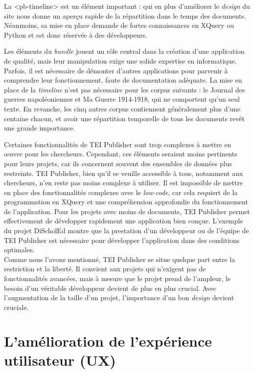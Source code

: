 La <pb-timeline> est un élément important : qui en plus d'améliorer le \textit{design} du site nous donne un aperçu rapide de la répartition dans le temps des documents. Néanmoins, sa mise en place demande de fortes connaissances en XQuery ou Python et est donc réservée à des développeurs.

Les éléments du \textit{bundle} jouent un rôle central dans la création d'une application de qualité, mais leur manipulation exige une solide expertise en informatique. Parfois, il est nécessaire de démonter d'autres applications pour parvenir à comprendre leur fonctionnement, faute de documentation adéquate. La mise en place de la \textit{timeline} n'est pas nécessaire pour les corpus suivants : le \og{}Journal des guerres napoléoniennes\fg{} et \og{}Ma Guerre 1914-1918\fg{}, qui ne comportent qu'un seul texte. En revanche, les cinq autres corpus contiennent généralement plus d’une centaine chacun, et avoir une répartition temporelle de tous les documents revêt une grande importance.

Certaines fonctionnalités de TEI Publisher sont trop complexes à mettre en œuvre pour les chercheurs. Cependant, ces éléments seraient moins pertinents pour leurs projets, car ils concernent souvent des ensembles de données plus restreints. TEI Publisher, bien qu'il se veuille accessible à tous, notamment aux chercheurs, n'en reste pas moins complexe à utiliser. Il est impossible de mettre en place des fonctionnalités complexes avec le \textit{low-code}, car cela requiert de la programmation en XQuery et une compréhension approfondie du fonctionnement de l'application. Pour les projets avec moins de documents, TEI Publisher permet effectivement de développer rapidement une application bien conçue. L'exemple du projet DiScholEd montre que la prestation d'un développeur ou de l'équipe de TEI Publisher est nécessaire pour développer l'application dans des conditions optimales.\\

Comme nous l'avons mentionné, TEI Publisher se situe quelque part entre la restriction et la liberté. Il convient aux projets qui n'exigent pas de fonctionnalités avancées, mais à mesure que le projet prend de l'ampleur, le besoin d'un véritable développeur devient de plus en plus crucial. Avec l'augmentation de la taille d'un projet, l'importance d'un bon \textit{design} devient cruciale.  

\chapter{L'amélioration de l'expérience utilisateur (UX)}


